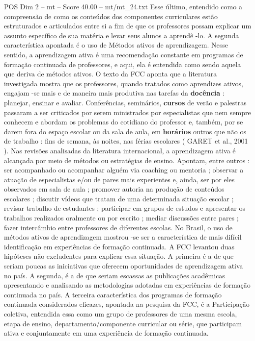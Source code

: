\begin{textsample}{POS Dim 2 – mt – Score 40.00 – mt/mt\_24.txt}
Esse último, entendido como a compreensão de como os conteúdos dos componentes curriculares estão estruturados e articulados entre si a fim de que os professores possam explicar um assunto específico de sua matéria e levar seus alunos a aprendê -lo.
A segunda característica apontada é o uso de Métodos ativos de aprendizagem.
Nesse sentido, a aprendizagem ativa é uma recomendação constante em programas de formação continuada de professores, e aqui, ela é entendida como sendo aquela que deriva de métodos ativos.
O texto da FCC aponta que a literatura investigada mostra que os professores, quando tratados como aprendizes ativos, engajam -se mais e de maneira mais produtiva nas tarefas da \textbf{docência} : planejar, ensinar e avaliar.
Conferências, seminários, \textbf{cursos} de verão e palestras passaram a ser criticados por serem ministrados por especialistas que nem sempre conhecem e abordam os problemas do cotidiano do professor e, também, por se darem fora do espaço escolar ou da sala de aula, em \textbf{horários} outros que não os de trabalho : fins de semana, às noites, nas férias escolares ( GARET et al., 2001 ).
Nas revisões analisadas da literatura internacional, a aprendizagem ativa é alcançada por meio de métodos ou estratégias de ensino.
Apontam, entre outros : ser acompanhado ou acompanhar alguém via coaching ou mentoria ; observar a atuação de especialistas e/ou de pares mais experientes e, ainda, ser por eles observados em sala de aula ; promover autoria na produção de conteúdos escolares ; discutir vídeos que tratam de uma determinada situação escolar ; revisar trabalho de estudantes ; participar em grupos de estudos e apresentar os trabalhos realizados oralmente ou por escrito ; mediar discussões entre pares ; fazer intercâmbio entre professores de diferentes escolas.
No Brasil, o uso de métodos ativos de aprendizagem mostrou -se ser a característica de mais difícil identificação em experiências de formação continuada.
A FCC levantou duas hipóteses não excludentes para explicar essa situação.
A primeira é a de que seriam poucas as iniciativas que oferecem oportunidades de aprendizagem ativa no país.
A segunda, é a de que seriam escassas as publicações acadêmicas apresentando e analisando as metodologias adotadas em experiências de formação continuada no país.
A terceira característica dos programas de formação continuada considerados eficazes, apontada na pesquisa da FCC, é a Participação coletiva, entendida essa como um grupo de professores de uma mesma escola, etapa de ensino, departamento/componente curricular ou série, que participam ativa e conjuntamente em uma experiência de formação continuada.

\end{textsample}
